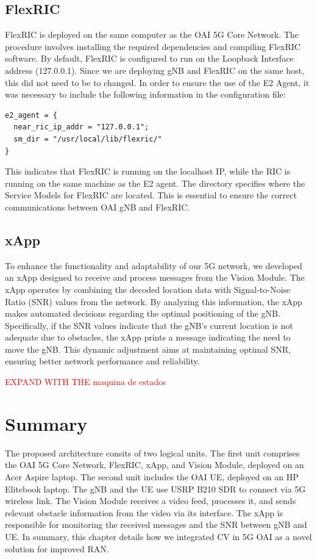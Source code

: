 \subsection{FlexRIC}\label{subsec:flexric}
FlexRIC is deployed on the same computer as the OAI 5G Core Network.
The procedure involves installing the required dependencies and compiling FlexRIC software.
By default, FlexRIC is configured to run on the Loopback Interface address (127.0.0.1).
Since we are deploying gNB and FlexRIC on the same host, this did not need to be to changed.
In order to ensure the use of the E2 Agent, it was necessary to include the following information in the configuration file:

\begin{verbatim}
e2_agent = {
  near_ric_ip_addr = "127.0.0.1";
  sm_dir = "/usr/local/lib/flexric/"
}
\end{verbatim}

This indicates that FlexRIC is running on the localhost IP, while the RIC is running on the same machine as the E2 agent.
The directory specifies where the Service Models for FlexRIC are located.
This is essential to ensure the correct communications between OAI gNB and FlexRIC\@.

\subsection{xApp}\label{subsec:xapp}
To enhance the functionality and adaptability of our 5G network, we developed an xApp designed to receive and process messages from the Vision Module.
The xApp operates by combining the decoded location data with Signal-to-Noise Ratio (SNR) values from the network.
By analyzing this information, the xApp makes automated decisions regarding the optimal positioning of the gNB\@.
Specifically, if the SNR values indicate that the gNB's current location is not adequate due to obstacles, the xApp prints a message indicating the need to move the gNB\@.
This dynamic adjustment aims at maintaining optimal SNR, ensuring better network performance and reliability.

\textcolor{red}{EXPAND WITH THE maquina de estados}

\section{Summary}\label{sec:summary}
The proposed architecture consits of two logical units.
The first unit comprises the OAI 5G Core Network, FlexRIC, xApp, and Vision Module, deployed on an Acer Aspire laptop.
The second unit includes the OAI UE, deployed on an HP Elitebook laptop.
The gNB and the UE use USRP B210 SDR to connect via 5G wireless link.
The Vision Module receives a video feed, processes it, and sends relevant obstacle information from the video via its interface.
The xApp is responsible for monitoring the received messages and the SNR between gNB and UE\@.
In summary, this chapter details how we integrated CV in 5G OAI as a novel solution for improved RAN\@.






